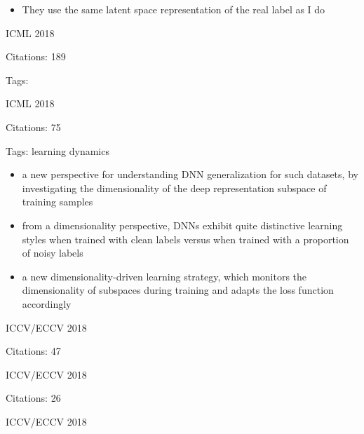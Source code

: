 \documentclass[11pt]{article}
\begin{document}
\begin{itemize}
\item They use the same latent space representation of the real label as I do
\end{itemize}

\vspace{2cm}

\noindent ICML 2018

\noindent Citations: 189

\noindent Tags:


\vspace{2cm}

\noindent ICML 2018

\noindent Citations: 75

\noindent Tags: learning dynamics

\begin{itemize}
\item a new perspective for understanding DNN generalization for such datasets, by investigating the dimensionality of the deep representation subspace of training samples
\item from a dimensionality perspective, DNNs exhibit quite distinctive learning styles when trained with clean labels versus when trained with a proportion of noisy labels
\item a new dimensionality-driven learning strategy, which monitors the dimensionality of subspaces during training and adapts the loss function accordingly
\end{itemize}

\vspace{2cm}

\noindent ICCV/ECCV 2018

\noindent Citations: 47

\vspace{2cm}

\noindent ICCV/ECCV 2018

\noindent Citations: 26

\vspace{2cm}

\noindent ICCV/ECCV 2018
\end{document}
